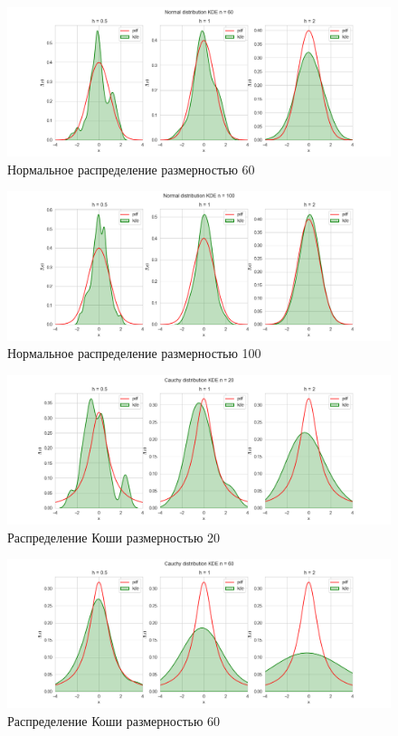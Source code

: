 \documentclass[a4paper,14pt]{article}
\begin{document}
	\begin{figure}[H]
		\centering
		\includegraphics[scale=0.48]{./lab1_4/pictures/Normal distributionKDE60.png}
		\caption{Нормальное распределение размерностью 60}
	\end{figure}
	
	\begin{figure}[H]
		\centering
		\includegraphics[scale=0.48]{./lab1_4/pictures/Normal distributionKDE100.png}
		\caption{Нормальное распределение размерностью 100}
	\end{figure}
	
	\begin{figure}[H]
		\centering
		\includegraphics[scale=0.48]{./lab1_4/pictures/Cauchy distributionKDE20.png}
		\caption{Распределение Коши размерностью 20}
	\end{figure}
	
	\begin{figure}[H]
		\centering
		\includegraphics[scale=0.48]{./lab1_4/pictures/Cauchy distributionKDE60.png}
		\caption{Распределение Коши размерностью 60}
	\end{figure}
	
\end{document}
